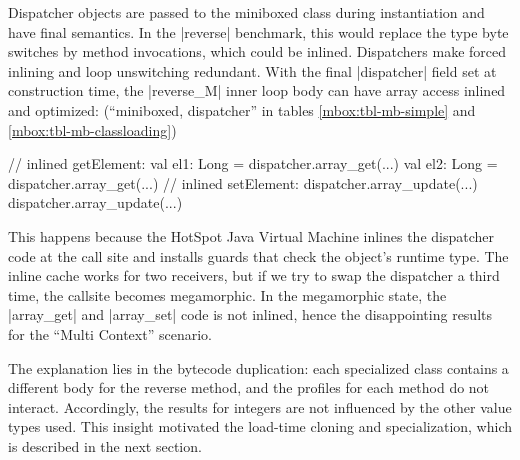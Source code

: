 Dispatcher objects are passed to the miniboxed class during instantiation and have final semantics. In the |reverse| benchmark, this would replace the type byte switches by method invocations, which could be inlined. Dispatchers make forced inlining and loop unswitching redundant. With the final |dispatcher| field set at construction time, the |reverse_M| inner loop body can have array access inlined and optimized: (``miniboxed,  dispatcher'' in tables \ref{mbox:tbl-mb-simple} and \ref{mbox:tbl-mb-classloading})

\begin{lstlisting-nobreak}
 // inlined getElement:
 val el1: Long = dispatcher.array_get(...)
 val el2: Long = dispatcher.array_get(...)
 // inlined setElement:
 dispatcher.array_update(...)
 dispatcher.array_update(...)
\end{lstlisting-nobreak}

 This happens because the HotSpot Java Virtual Machine inlines the dispatcher code at the call site and installs guards that check the object's runtime type. The inline cache works for two receivers, but if we try to swap the dispatcher a third time, the callsite becomes megamorphic. In the megamorphic state, the |array_get| and |array_set| code is not inlined, hence the disappointing results for the ``Multi Context'' scenario.

 The explanation lies in the bytecode duplication: each specialized class contains a different body for the reverse method, and the profiles for each method do not interact. Accordingly, the results for integers are not influenced by the other value types used. This insight motivated the load-time cloning and specialization, which is described in the next section.